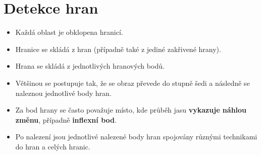 \section{Detekce hran}
\begin{itemize}
    \item Každá oblast je obklopena hranicí.
    \item Hranice se skládá z hran (případně také z jediné zakřivené hrany).

    \item Hrana se skládá z jednotlivých hranových bodů.
    \item Většinou se postupuje tak, že se obraz převede do stupně šedi a následně se naleznou jednotlivé body hran.
    \item Za bod hrany se často považuje místo, kde průběh jasu \textbf{vykazuje náhlou změnu}, případně \textbf{inflexní bod}.
    \item Po nalezení jsou jednotlivé nalezené body hran spojovány různými technikami do hran a celých hranic.
\end{itemize}
